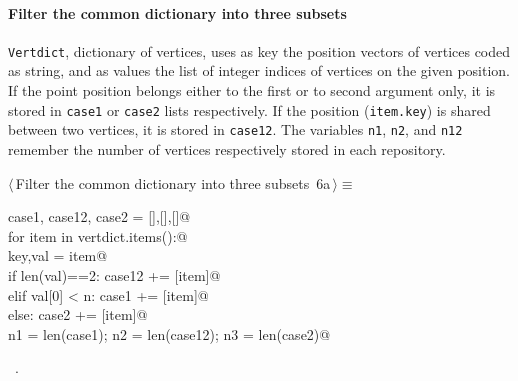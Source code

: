 \documentclass[11pt,oneside]{article}	%
\begin{document}
\paragraph{Filter the common dictionary into three subsets}
\texttt{Vertdict}, dictionary of vertices, uses as key the position vectors of vertices coded as string, and as values the list of integer indices of vertices on the given position. If the point position belongs either to the first or to second argument only, it is stored in \texttt{case1} or \texttt{case2} lists respectively. If the position (\texttt{item.key}) is shared between two vertices, it is stored in \texttt{case12}.
The variables \texttt{n1}, \texttt{n2}, and \texttt{n12} remember the number of vertices respectively stored in each repository.
\begin{flushleft} \small \label{scrap6}
\protect{}$\langle\,$Filter the common dictionary into three subsets\nobreak\ {\footnotesize 6a}$\,\rangle\equiv$
\vspace{-1ex}
\begin{list}{}{} \item
\mbox{}\verb@   case1, case12, case2 = [],[],[]@\\
\mbox{}\verb@   for item in vertdict.items():@\\
\mbox{}\verb@      key,val = item@\\
\mbox{}\verb@      if len(val)==2:  case12 += [item]@\\
\mbox{}\verb@      elif val[0] < n: case1 += [item]@\\
\mbox{}\verb@      else: case2 += [item]@\\
\mbox{}\verb@   n1 = len(case1); n2 = len(case12); n3 = len(case2)@\\
\mbox{}\verb@@{\NWsep}
\end{list}
\vspace{-1ex}
\footnotesize\addtolength{\baselineskip}{-1ex}
\begin{list}{}{\setlength{\itemsep}{-\parsep}\setlength{\itemindent}{-\leftmargin}}
\item \NWtxtMacroRefIn\ .
\end{list}
\end{flushleft}
\end{document}
